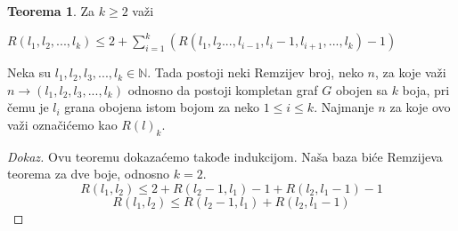 \documentclass{article}
\theoremstyle{definition}
\newtheorem{teorema}{Teorema}[section]
\newcommand{\dokaz}[1]{\begin{proof}[Dokaz]#1\end{proof}}
\begin{document}
	\begin{teorema}
Za $k \geq 2$ važi 

$ R(l_1, l_2, ... , l_k) \leq 2 + \sum\limits_{i=1}^{k}(R(l_1, l_2 ... , l_{i-1}, l_i-1, l_{i+1}, ... , l_k)-1) $
\end{teorema}


Neka su $l_1, l_2, l_3, ... , l_k \in \mathbb{N}$. Tada postoji neki Remzijev broj, neko $n$, za koje važi $n \rightarrow (l_1, l_2, l_3, ... , l_k)$ odnosno da postoji kompletan graf $G$ obojen sa $k$ boja, pri čemu je $l_i$ grana obojena istom bojom za neko $1 \leq i \leq k$. Najmanje $n$ za koje ovo važi označićemo kao $R(l)_k$. 

\dokaz{
Ovu teoremu dokazaćemo takođe indukcijom. Naša baza biće Remzijeva teorema za dve boje, odnosno $k=2$. 
\[R(l_1,l_2) \leq 2+ R(l_2-1, l_1) -1 + R(l_2, l_1-1)-1
\]
\[
R(l_1,l_2) \leq R(l_2-1, l_1) + R(l_2, l_1-1)
\]
}

\end{document}
